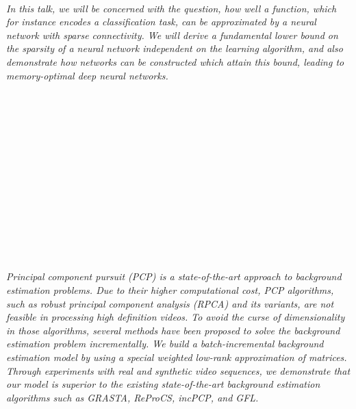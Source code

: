 \begin{multicols}{2}
        \\\\
        \\
        \\\\
\\
      \textit{In this talk, we will be concerned with the question, how well a function, which for instance encodes a classification task, can be approximated by a neural network with sparse connectivity. We will derive a fundamental lower bound on the sparsity of a neural network independent on the learning algorithm, and also demonstrate how networks can be constructed which attain this bound, leading to memory-optimal deep neural networks.}\\
\\ 
        \\
        \\\\
        \\
        \\\\
        \\
        \\\\
        \\
        \\\\
\\
      \textit{Principal component pursuit (PCP) is a state-of-the-art approach to background estimation problems. Due to their higher computational cost, PCP algorithms, such as robust principal component analysis (RPCA) and its variants, are not feasible in processing high definition videos. To avoid the curse of dimensionality in those algorithms, several methods have been proposed to solve the background estimation problem incrementally. We build a batch-incremental background estimation model by using a special weighted low-rank approximation of matrices. Through experiments with real and synthetic video sequences, we demonstrate that our model is superior to the existing state-of-the-art background estimation algorithms such as GRASTA, ReProCS, incPCP, and GFL.}\\
\\ 

\end{multicols}
